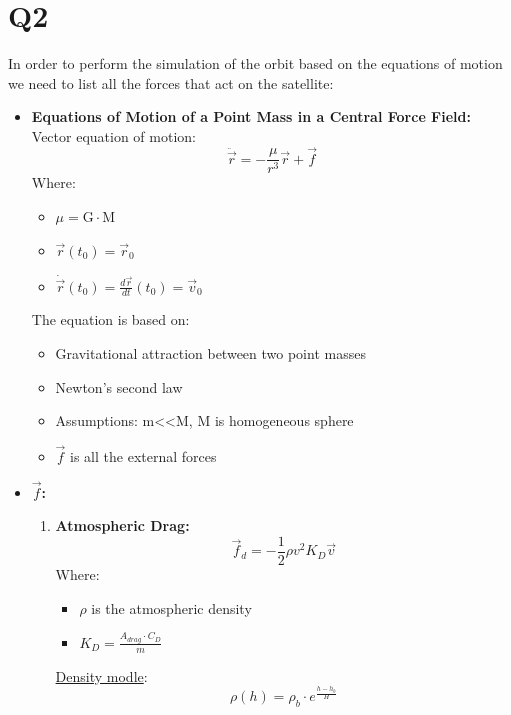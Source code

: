 \documentclass[11pt, a4paper]{article}
\begin{document}
\section{Q2}
In order to perform the simulation of the orbit based on the equations of motion we need to list all the forces that act on the satellite:
\begin{itemize}
    \item \textbf{\Large Equations of Motion of a Point Mass in a Central Force Field:}\\
    Vector equation of motion:
    \begin{equation}
        \ddot \vec{r} = -\frac{\mu}{r^3}\vec{r}+\vec{f}
    \end{equation}
    Where:
    \begin{itemize}
        \item $\mu = \text{G}\cdot \text{M}$
        \item $\vec{r}(t_0) = \vec{r}_0$
        \item $\dot \vec{r}(t_0) = \frac{d\vec{r}}{dt}(t_0) = \vec{v}_0$
    \end{itemize}
    The equation is based on:
    \begin{itemize}
        \item Gravitational attraction between two point masses
        \item Newton's second law
        \item Assumptions: m<<M, M is homogeneous sphere
        \item $\vec{f}$ is all the external forces 
    \end{itemize}
    \item \textbf{\Large $\vec{f}$:}
    \begin{enumerate}
        \item \textbf{\large Atmospheric Drag:}  \begin{equation}
            \vec{f}_d = -\frac{1}{2}\rho v^2K_D\vec{v}
        \end{equation}
        Where:
        \begin{itemize}
            \item $\rho$ is the atmospheric density
            \item $\displaystyle{K_D = \frac{A_{drag}\cdot C_D}{m}}$
        \end{itemize}
        \underline{Density modle}:
        \begin{equation}
            \rho(h) = \rho_b\cdot e^{\frac{h-h_b}{H}}
        \end{equation}

\end{enumerate}
\end{itemize}
\end{document}
